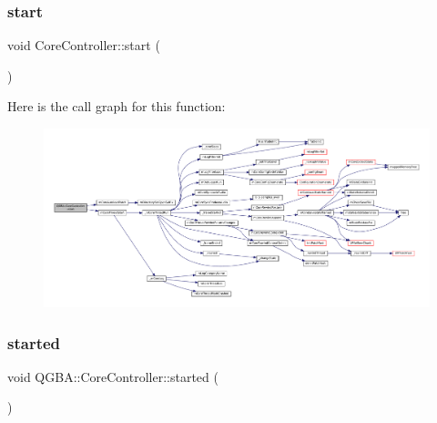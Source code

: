 \subsubsection{\texorpdfstring{start}{start}}
{\footnotesize\ttfamily void Core\+Controller\+::start (\begin{DoxyParamCaption}{ }\end{DoxyParamCaption})\hspace{0.3cm}{\ttfamily [slot]}}

Here is the call graph for this function\+:
\nopagebreak
\begin{figure}[H]
\begin{center}
\leavevmode
\includegraphics[width=350pt]{class_q_g_b_a_1_1_core_controller_ab1fcc2b4218c46e5805f99c8196497cc_cgraph}
\end{center}
\end{figure}
\mbox{\label{class_q_g_b_a_1_1_core_controller_ab09314b20d031ba7015aafe48bfb8107}} 
\subsubsection{\texorpdfstring{started}{started}}
{\footnotesize\ttfamily void Q\+G\+B\+A\+::\+Core\+Controller\+::started (\begin{DoxyParamCaption}{ }\end{DoxyParamCaption})\hspace{0.3cm}{\ttfamily [signal]}}

